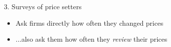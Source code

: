 \documentclass{beamer}
\begin{document}
\begin{frame}


\begin{center}
\begin{figure}[h!]
\end{figure}

\end{center}

\end{frame}
\begin{frame}{3. Surveys of price setters}

\begin{itemize}
\small
\item Ask firms directly how often they changed prices
\item ...also ask them how often they \emph{review} their prices
\end{itemize}



\end{frame}
\end{document}
